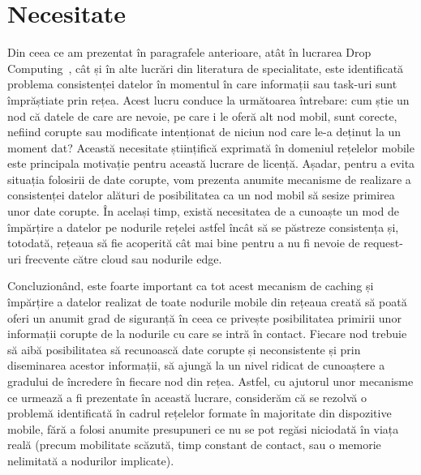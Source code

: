\documentclass[12pt,a4paper]{report}
\begin{document}
\section{Necesitate}
Din ceea ce am prezentat în paragrafele anterioare, atât în lucrarea Drop Computing~\cite{DC}, cât și în alte lucrări din literatura de specialitate, este identificată problema consistenței datelor în momentul în care informații sau task-uri sunt împrăștiate prin rețea. Acest lucru conduce la următoarea întrebare: cum știe un nod că datele de care are nevoie, pe care i le oferă alt nod mobil, sunt corecte, nefiind corupte sau modificate intenționat de niciun nod care le-a deținut la un moment dat? Această necesitate științifică exprimată în domeniul rețelelor mobile este principala motivație pentru această lucrare de licență. Așadar, pentru a evita situația folosirii de date corupte, vom prezenta anumite mecanisme de realizare a consistenței datelor alături de posibilitatea ca un nod mobil să sesize primirea unor date corupte. În același timp, există necesitatea de a cunoaște un mod de împărțire a datelor pe nodurile rețelei astfel încât să se păstreze consistența și, totodată, rețeaua să fie acoperită cât mai bine pentru a nu fi nevoie de request-uri frecvente către cloud sau nodurile edge.

Concluzionând, este foarte important ca tot acest mecanism de caching și împărțire a datelor realizat de toate nodurile mobile din rețeaua creată să poată oferi un anumit grad de siguranță în ceea ce privește posibilitatea primirii unor informații corupte de la nodurile cu care se intră în contact. Fiecare nod trebuie să aibă posibilitatea să recunoască date corupte și neconsistente și prin diseminarea acestor informații, să ajungă la un nivel ridicat de cunoaștere a gradului de încredere în fiecare nod din rețea. Astfel, cu ajutorul unor mecanisme ce urmează a fi prezentate în această lucrare, considerăm că se rezolvă o problemă identificată în cadrul rețelelor formate în majoritate din dispozitive mobile, fără a folosi anumite presupuneri ce nu se pot regăsi niciodată în viața reală (precum mobilitate scăzută, timp constant de contact, sau o memorie nelimitată a nodurilor implicate).
\end{document}
